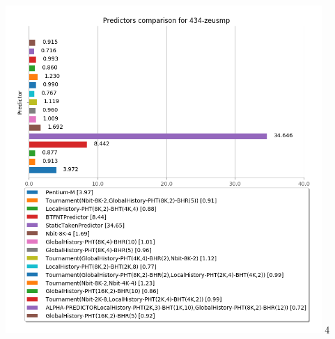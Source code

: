    \begin{minipage}{\textwidth}
      \begin{center}
         \\
         \vspace{3mm}
         \includegraphics[width=0.9\textwidth, frame]{./graphs/4-5/434-zeusmp.png}
         \vspace{6mm}4
      \end{center}
   \end{minipage}


